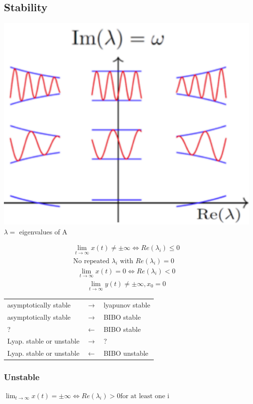 \subsection{Stability}
    \begin{minipage}{0.39\linewidth}
        \includegraphics[width = \linewidth]{src/images/eigenvalue_response.png}
        $\lambda =$ eigenvalues of A
    \end{minipage}
    \begin{minipage}{0.59\linewidth}
        \begin{align*}
            \lim_{t \rightarrow \infty} x(t) \neq \pm \infty \Leftrightarrow Re(\lambda_i) \leq 0\\
            \text{No repeated } \lambda_i \text{ with } Re(\lambda_i) = 0
        \end{align*}
%
        \begin{align*}
            \lim_{t \rightarrow \infty} x(t) = 0 \Leftrightarrow Re(\lambda_i) < 0
        \end{align*}
%
        \begin{align*}
            \lim_{t \rightarrow \infty} y(t) \neq \pm \infty, x_0 = 0
        \end{align*}
    \end{minipage}

    \begin{tabu}{|X[6] X X[3]|}
        \hline
        asymptotically stable & $\rightarrow$ & lyapunov stable\\
        asymptotically stable & $\rightarrow$ & BIBO stable\\
        ? & $\leftarrow$ & BIBO stable\\
        Lyap. stable or unstable & $\rightarrow$ & ?\\
        Lyap. stable or unstable & $\leftarrow$ & BIBO unstable\\
        \hline
    \end{tabu}

    \subsubsection{Unstable}
    $\lim_{t \rightarrow \infty} x(t) = \pm \infty \Leftrightarrow Re(\lambda_i) > 0 \text{for at least one i}$